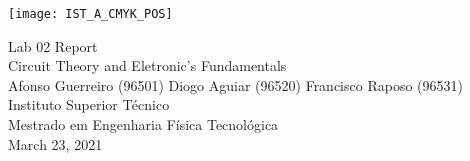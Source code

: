 
\thispagestyle {empty}

\texttt{[image: IST\_A\_CMYK\_POS]}

\begin{center}
%
\vspace{1.0cm}

\vspace{1cm}
{\FontLb Lab 02 Report} \\ %
{\FontSn Circuit Theory and Eletronic's Fundamentals} \\ %
\vspace{1cm}
{\FontSn Afonso Guerreiro (96501) Diogo Aguiar (96520) Francisco Raposo (96531) \\Instituto Superior Técnico\\ Mestrado em Engenharia Física Tecnológica\\}
\vspace{1cm}
{\FontSn March 23, 2021} \\ %
%
\end{center}


